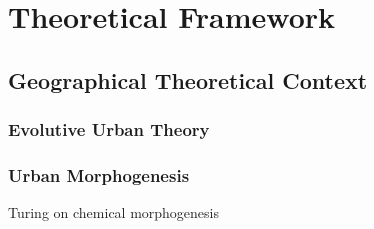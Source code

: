 



\chapter{Theoretical Framework} %

\label{ch:theory} %







\section{Geographical Theoretical Context}


\subsection{Evolutive Urban Theory}







\subsection{Urban Morphogenesis}


Turing on chemical morphogenesis~\cite{turing1952chemical}











